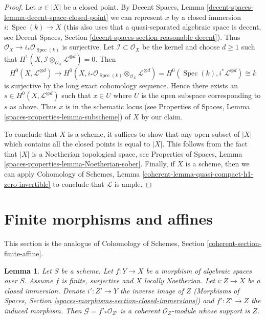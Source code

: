\documentclass{stacks-project}
\theoremstyle{plain}
\newtheorem{lemma}[subsection]{Lemma}
\theoremstyle{definition}
\theoremstyle{remark}
\numberwithin{equation}{subsection}
\def\Spec{\mathop{\mathrm{Spec}}}
\begin{document}
\begin{proof}
\medskip\noindent
Let $x \in |X|$ be a closed point. By Decent Spaces, Lemma
\ref{decent-spaces-lemma-decent-space-closed-point}
we can represent $x$ by a closed immersion $i : \Spec(k) \to X$
(this also uses that a quasi-separated algebraic space is
decent, see Decent Spaces, Section
\ref{decent-spaces-section-reasonable-decent}).
Thus $\mathcal{O}_X \to i_*\mathcal{O}_{\Spec(k)}$ is surjective.
Let $\mathcal{I} \subset \mathcal{O}_X$ be the kernel and choose
$d \geq 1$ such that
$H^1(X, \mathcal{I} \otimes_{\mathcal{O}_X} \mathcal{L}^{\otimes d}) = 0$.
Then
$$
H^0(X, \mathcal{L}^{\otimes d}) \to
H^0(X,
i_*\mathcal{O}_{\Spec(k)} \otimes_{\mathcal{O}_X} \mathcal{L}^{\otimes d}) =
H^0(\Spec(k), i^*\mathcal{L}^{\otimes d}) \cong k
$$
is surjective by the long exact cohomology sequence. Hence
there exists an $s \in H^0(X, \mathcal{L}^{\otimes d})$
such that $x \in U$ where $U$ is the open subspace corresponding to $s$
as above. Thus $x$ is in the schematic locus
(see Properties of Spaces, Lemma \ref{spaces-properties-lemma-subscheme})
of $X$ by our claim.

\medskip\noindent
To conclude that $X$ is a scheme, it suffices to show that
any open subset of $|X|$ which contains all the closed points
is equal to $|X|$. This follows from the fact that $|X|$
is a Noetherian topological space, see
Properties of Spaces, Lemma \ref{spaces-properties-lemma-Noetherian-sober}.
Finally, if $X$ is a scheme, then we can apply
Cohomology of Schemes, Lemma
\ref{coherent-lemma-quasi-compact-h1-zero-invertible}
to conclude that $\mathcal{L}$ is ample.
\end{proof}









\section{Finite morphisms and affines}
\label{section-finite-affine}

\noindent
This section is the analogue of
Cohomology of Schemes, Section \ref{coherent-section-finite-affine}.

\begin{lemma}
\label{lemma-finite-morphism-Noetherian}
Let $S$ be a scheme. Let $f : Y \to X$ be a morphism of algebraic spaces
over $S$. Assume $f$ is finite, surjective and $X$ locally Noetherian.
Let $i : Z \to X$ be a closed immersion. Denote $i' : Z' \to Y$
the inverse image of $Z$
(Morphisms of Spaces, Section \ref{spaces-morphisms-section-closed-immersions})
and $f' : Z' \to Z$
the induced morphism. Then $\mathcal{G} = f'_*\mathcal{O}_{Z'}$
is a coherent $\mathcal{O}_Z$-module whose support is $Z$.
\end{lemma}
\end{document}
